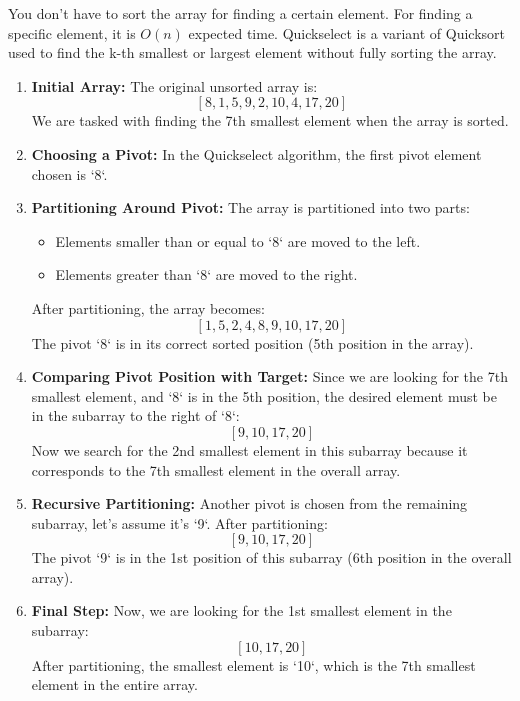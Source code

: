     \begin{example}
        You don't have to sort the array for finding a certain element. For finding a specific element, it is $O(n)$ expected time. Quickselect is a variant of Quicksort used to find the
        k-th smallest or largest element without fully sorting the array.            
        \begin{enumerate}
            \item \textbf{Initial Array:} The original unsorted array is:
            \[
            [8, 1, 5, 9, 2, 10, 4, 17, 20]
            \]
            We are tasked with finding the 7th smallest element when the array is sorted.
            
            \item \textbf{Choosing a Pivot:} In the Quickselect algorithm, the first pivot element chosen is `8`.
            
            \item \textbf{Partitioning Around Pivot:} The array is partitioned into two parts:
            \begin{itemize}
                \item Elements smaller than or equal to `8` are moved to the left.
                \item Elements greater than `8` are moved to the right.
            \end{itemize}
            After partitioning, the array becomes:
            \[
            [1, 5, 2, 4, 8, 9, 10, 17, 20]
            \]
            The pivot `8` is in its correct sorted position (5th position in the array).
            
            \item \textbf{Comparing Pivot Position with Target:} Since we are looking for the 7th smallest element, and `8` is in the 5th position, the desired element must be in the subarray to the right of `8`:
            \[
            [9, 10, 17, 20]
            \]
            Now we search for the 2nd smallest element in this subarray because it corresponds to the 7th smallest element in the overall array.
            
            \item \textbf{Recursive Partitioning:} Another pivot is chosen from the remaining subarray, let’s assume it’s `9`. After partitioning:
            \[
            [9, 10, 17, 20]
            \]
            The pivot `9` is in the 1st position of this subarray (6th position in the overall array).
            
            \item \textbf{Final Step:} Now, we are looking for the 1st smallest element in the subarray:
            \[
            [10, 17, 20]
            \]
            After partitioning, the smallest element is `10`, which is the 7th smallest element in the entire array.
        \end{enumerate}        
    \end{example}